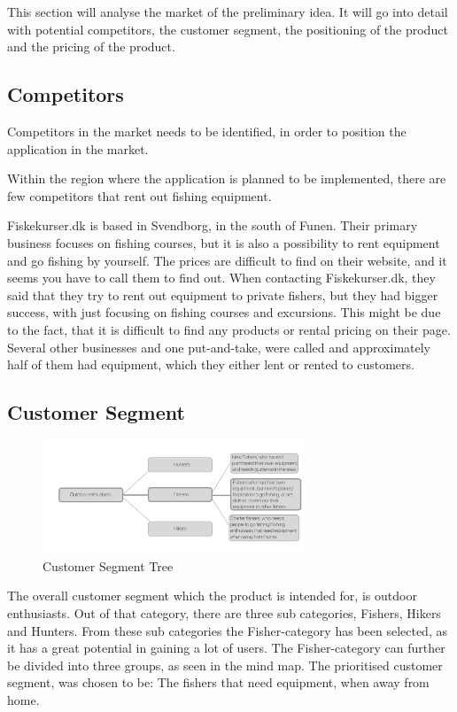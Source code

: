 This section will analyse the market of the preliminary idea. It will go into detail with potential competitors, the customer segment, the positioning of the product and the pricing of the product.

\subsection{Competitors}
Competitors in the market needs to be identified, in order to position the application in the market.

Within the region where the application is planned to be implemented, there are few competitors that rent out fishing equipment. 

Fiskekurser.dk is based in Svendborg, in the south of Funen. Their primary business focuses on fishing courses, but it is also a possibility to rent equipment and go fishing by yourself.
The prices are difficult to find on their website, and it seems you have to call them to find out.
When contacting Fiskekurser.dk, they said that they try to rent out equipment to private fishers, but they had bigger success, with just focusing on fishing courses and excursions. This might be due to the fact, that it is difficult to find any products or rental pricing on their page.
Several other businesses and one put-and-take, were called and approximately half of them had equipment, which they either lent or rented to customers.

\subsection{Customer Segment}
\begin{figure}[t!]
  \centering
  \includegraphics[width=0.7\textwidth]{images/SegmentTree}
  \caption{Customer Segment Tree}
\end{figure}



The overall customer segment  which the product is intended for, is outdoor enthusiasts. Out of that category, there are three sub categories, Fishers, Hikers and Hunters. From these sub categories the Fisher-category has been selected, as it has a great potential in gaining a lot of users. The Fisher-category can further be divided into three groups, as seen in the mind map. The prioritised customer segment, was chosen to be: The fishers that need equipment, when away from home.  

